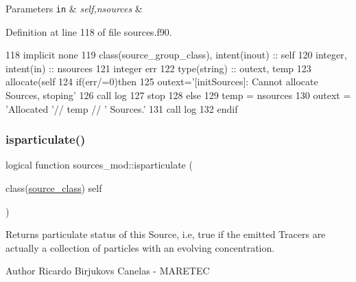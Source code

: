 \begin{DoxyParams}[1]{Parameters}
\mbox{\tt in}  & {\em self,nsources} & \\
\hline
\end{DoxyParams}


Definition at line 118 of file sources.\+f90.


\begin{DoxyCode}
118     \textcolor{keywordtype}{implicit none}
119     \textcolor{keywordtype}{class}(source\_group\_class), \textcolor{keywordtype}{intent(inout)} :: self
120     \textcolor{keywordtype}{integer}, \textcolor{keywordtype}{intent(in)} :: nsources
121     \textcolor{keywordtype}{integer} err
122     \textcolor{keywordtype}{type}(string) :: outext, temp
123     \textcolor{keyword}{allocate}(self%
124     \textcolor{keywordflow}{if}(err/=0)\textcolor{keywordflow}{then}
125         outext=\textcolor{stringliteral}{'[initSources]: Cannot allocate Sources, stoping'}
126         \textcolor{keyword}{call }log%
127         stop
128     \textcolor{keywordflow}{else}
129         temp = nsources
130         outext = \textcolor{stringliteral}{'Allocated '}// temp // \textcolor{stringliteral}{' Sources.'}
131         \textcolor{keyword}{call }log%
132 \textcolor{keywordflow}{    endif}
\end{DoxyCode}
\mbox{\label{namespacesources__mod_ac4e4f33da78d030e1b56a48789da6a05}} 
\subsubsection{\texorpdfstring{isparticulate()}{isparticulate()}}
{\footnotesize\ttfamily logical function sources\+\_\+mod\+::isparticulate (\begin{DoxyParamCaption}\item[{class(\mbox{\hyperlink{structsources__mod_1_1source__class}{source\+\_\+class}})}]{self }\end{DoxyParamCaption})\hspace{0.3cm}{\ttfamily [private]}}



Returns particulate status of this Source, i.\+e, true if the emitted Tracers are actually a collection of particles with an evolving concentration. 

\begin{DoxyAuthor}{Author}
Ricardo Birjukovs Canelas -\/ M\+A\+R\+E\+T\+EC 
\end{DoxyAuthor}



